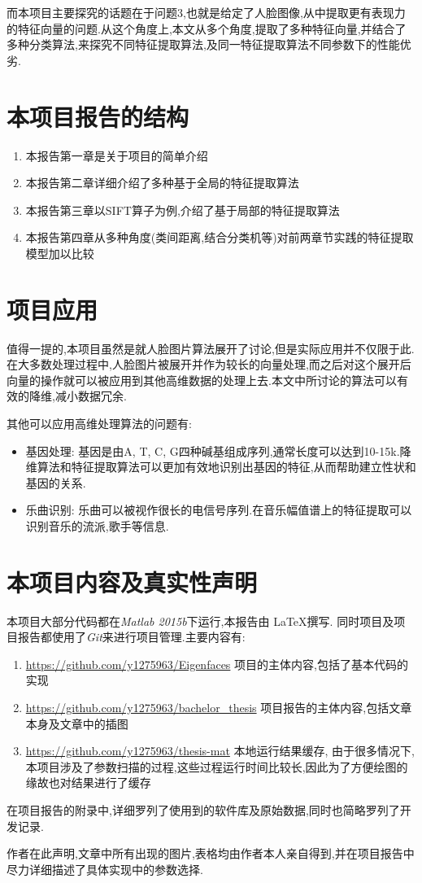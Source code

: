 而本项目主要探究的话题在于问题3,也就是给定了人脸图像,从中提取更有表现力的特征向量的问题.从这个角度上,本文从多个角度,提取了多种特征向量,并结合了多种分类算法,来探究不同特征提取算法,及同一特征提取算法不同参数下的性能优劣.
\section{本项目报告的结构}
\begin{enumerate}
	\item 本报告第一章是关于项目的简单介绍
	\item 本报告第二章详细介绍了多种基于全局的特征提取算法
	\item 本报告第三章以SIFT算子为例,介绍了基于局部的特征提取算法
	\item 本报告第四章从多种角度(类间距离,结合分类机等)对前两章节实践的特征提取模型加以比较
\end{enumerate}

\section{项目应用}
值得一提的,本项目虽然是就人脸图片算法展开了讨论,但是实际应用并不仅限于此.在大多数处理过程中,人脸图片被展开并作为较长的向量处理,而之后对这个展开后向量的操作就可以被应用到其他高维数据的处理上去.本文中所讨论的算法可以有效的降维,减小数据冗余.\newline


其他可以应用高维处理算法的问题有:

\begin{itemize}
	\item{基因处理: } 基因是由A, T, C, G四种碱基组成序列,通常长度可以达到10-15k\cite{twine2011whole}.降维算法和特征提取算法可以更加有效地识别出基因的特征,从而帮助建立性状和基因的关系.
	\item{乐曲识别:} 乐曲可以被视作很长的电信号序列.在音乐幅值谱上的特征提取可以识别音乐的流派,歌手等信息.
\end{itemize}



\section{本项目内容及真实性声明}

本项目大部分代码都在\textit{Matlab 2015b}下运行,本报告由 \LaTeX 撰写. 同时项目及项目报告都使用了\textit{Git}来进行项目管理.主要内容有:
\begin{enumerate}
	\item \url{https://github.com/y1275963/Eigenfaces} 项目的主体内容,包括了基本代码的实现
	\item \url{https://github.com/y1275963/bachelor_thesis} 项目报告的主体内容,包括文章本身及文章中的插图
	\item \url{https://github.com/y1275963/thesis-mat} 本地运行结果缓存, 由于很多情况下,本项目涉及了参数扫描的过程,这些过程运行时间比较长,因此为了方便绘图的缘故也对结果进行了缓存
\end{enumerate}

在项目报告的附录中,详细罗列了使用到的软件库及原始数据,同时也简略罗列了开发记录.\newline


作者在此声明,文章中所有出现的图片,表格均由作者本人亲自得到,并在项目报告中尽力详细描述了具体实现中的参数选择.